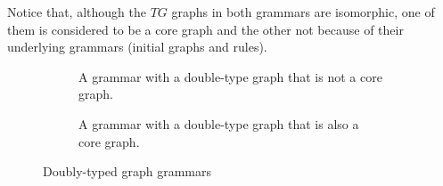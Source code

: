 \begin{example}
  Notice that, although the $TG$ graphs in both grammars are isomorphic, one of them is considered to be a core graph and the other not because of their underlying grammars (initial graphs and rules).
\begin{figure}[!ht]
  \centering
  \begin{subfigure}[t]{.5\textwidth}
    \centerline{}
    \caption{A grammar with a double-type graph that is not a core graph.}\label{fig:process:core-graph:counter-example}
  \end{subfigure}
  \begin{subfigure}[t]{.5\textwidth}
    \centerline{}
    \caption{A grammar with a double-type graph that is also a core graph.}\label{fig:process:core-graph:example}
  \end{subfigure}

  \caption{Doubly-typed graph grammars}\label{fig:process:doubly-typed-grammars}
\end{figure}

\end{example}

